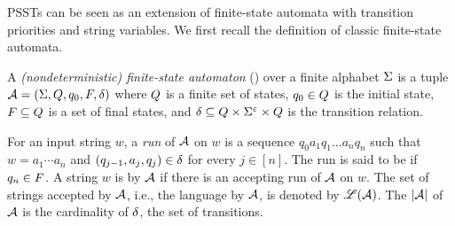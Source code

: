  
PSSTs can be seen as an extension of finite-state automata with transition priorities and string variables. We first recall the definition of classic finite-state automata.

\begin{definition} \label{def:nfa}
	A \emph{(nondeterministic) finite-state automaton}
	(\FA{}) over a finite alphabet $\Sigma$ is a tuple $\mathcal{A} =
	(\Sigma, Q, q_0, F, \delta)$ where 
	$Q$ is a finite set of 
	states, $q_0\in Q$ is
	the initial state, $F\subseteq Q$ is a set of final states, and 
	$\delta\subseteq Q \times 
	\Sigma^\varepsilon \times  Q$ is the
	transition relation. 
\end{definition}

For an input string $w$, a \emph{run} of $\mathcal{A}$ on $w$
is a sequence $q_0 a_1 q_1 \ldots a_n q_n$ such that $w = a_1 \cdots a_n$ and $(q_{j-1}, a_{j}, q_{j}) \in
\delta$ for every $j \in [n]$.
%
The run is said to be  if $q_n \in F$.
A string $w$ is  by $\mathcal{A}$ if there is an accepting run of
$\mathcal{A}$ on $w$. 
The set of strings accepted by $\mathcal{A}$, i.e., the language  by $\mathcal{A}$, is denoted by $\mathscr{L}(\mathcal{A})$.
The  $|\mathcal{A}|$ of $\mathcal{A}$ is the cardinality of $\delta$, the set of transitions.


